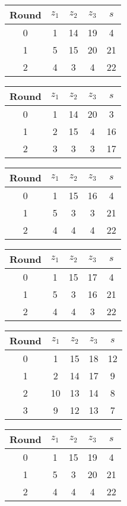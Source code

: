 \begin{multicols}{2}
\begin{tabular}{c | c | c | c | c }
Round & $z_1$ & $z_2$ & $z_3$ & $s$ \\
\hline
0 & 1 & 14 & 19 & 4 \\
1 & 5 & 15 & 20 & 21 \\
2 & 4 & 3 & 4 & 22
\end{tabular}


\begin{tabular}{c | c | c | c | c }
Round & $z_1$ & $z_2$ & $z_3$ & $s$ \\
\hline
0 & 1 & 14 & 20 & 3 \\
1 & 2 & 15 & 4 & 16 \\
2 & 3 & 3 & 3 & 17
\end{tabular}


\begin{tabular}{c | c | c | c | c }
Round & $z_1$ & $z_2$ & $z_3$ & $s$ \\
\hline
0 & 1 & 15 & 16 & 4 \\
1 & 5 & 3 & 3 & 21 \\
2 & 4 & 4 & 4 & 22
\end{tabular}


\begin{tabular}{c | c | c | c | c }
Round & $z_1$ & $z_2$ & $z_3$ & $s$ \\
\hline
0 & 1 & 15 & 17 & 4 \\
1 & 5 & 3 & 16 & 21 \\
2 & 4 & 4 & 3 & 22
\end{tabular}


\begin{tabular}{c | c | c | c | c }
Round & $z_1$ & $z_2$ & $z_3$ & $s$ \\
\hline
0 & 1 & 15 & 18 & 12 \\
1 & 2 & 14 & 17 & 9 \\
2 & 10 & 13 & 14 & 8 \\
3 & 9 & 12 & 13 & 7
\end{tabular}

\begin{tabular}{c | c | c | c | c }
Round & $z_1$ & $z_2$ & $z_3$ & $s$ \\
\hline
0 & 1 & 15 & 19 & 4 \\
1 & 5 & 3 & 20 & 21 \\
2 & 4 & 4 & 4 & 22
\end{tabular}
\end{multicols}
